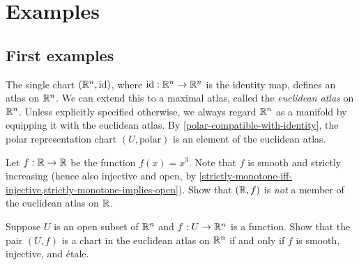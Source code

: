 \section{Examples}

\subsection{First examples}

\begin{example} \label{natural-euclidean-atlas}
	The single chart $(\mathbb{R}^n, \mathrm{id})$, where $\mathrm{id} : \mathbb{R}^n \to \mathbb{R}^n$ is the identity map, defines an atlas on $\mathbb{R}^n$. We can extend this to a maximal atlas, called the \emph{euclidean atlas} on $\mathbb{R}^n$. Unless explicitly specified otherwise, we always regard $\mathbb{R}^n$ as a manifold by equipping it with the euclidean atlas. By \cref{polar-compatible-with-identity}, the polar representation chart $(U, \text{polar})$ is an element of the euclidean atlas. 
\end{example}

\begin{exercise}
	Let $f : \mathbb{R} \to \mathbb{R}$ be the function $f(x) = x^3$. Note that $f$ is smooth and strictly increasing (hence also injective and open, by \cref{strictly-monotone-iff-injective,strictly-monotone-implies-open}). Show that $(\mathbb{R}, f)$ is \emph{not} a member of the euclidean atlas on $\mathbb{R}$. 
\end{exercise}

\begin{exercise} \label{euclidean-chart-characterization}
	Suppose $U$ is an open subset of $\mathbb{R}^n$ and $f : U \to \mathbb{R}^n$ is a function. Show that the pair $(U, f)$ is a chart in the euclidean atlas on $\mathbb{R}^n$ if and only if $f$ is smooth, injective, and \'etale.
\end{exercise}

